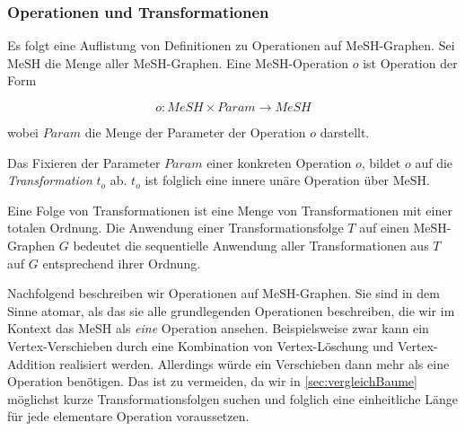 
\subsubsection{Operationen und Transformationen}
\label{sec:mesh_operationen}

Es folgt eine Auflistung von Definitionen zu Operationen auf MeSH-Graphen. Sei $\textrm{MeSH}$ die Menge aller MeSH-Graphen. Eine MeSH-Operation $o$ ist Operation der Form

\[
o: MeSH \times Param \rightarrow MeSH 
\] %

wobei $Param$ die Menge der Parameter der Operation $o$ darstellt. \par

Das Fixieren der Parameter $Param$ einer konkreten Operation $o$, bildet $o$ auf die \textit{Transformation} $t_o$ ab. $t_o$ ist folglich eine innere unäre Operation über $\textrm{MeSH}$.\par

Eine Folge von Transformationen ist eine Menge von Transformationen mit einer totalen Ordnung. Die Anwendung einer Transformationsfolge $T$ auf einen MeSH-Graphen $G$ bedeutet die sequentielle Anwendung aller Transformationen aus $T$ auf $G$ entsprechend ihrer Ordnung. \par


Nachfolgend beschreiben wir Operationen auf MeSH-Graphen. Sie sind in dem Sinne atomar, als das sie alle grundlegenden Operationen beschreiben, die wir im Kontext das MeSH als \textit{eine} Operation ansehen. Beispielsweise zwar kann ein Vertex-Verschieben durch eine Kombination von Vertex-Löschung und Vertex-Addition realisiert werden. Allerdings würde ein Verschieben dann mehr als eine Operation benötigen. Das ist zu vermeiden, da wir in \autoref{sec:vergleichBaume} möglichst kurze Transformationsfolgen suchen und folglich eine einheitliche Länge für jede elementare Operation voraussetzen.\par

